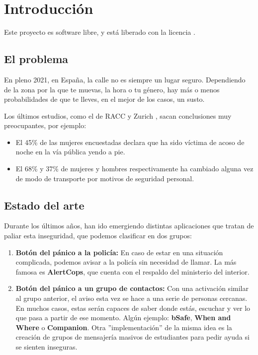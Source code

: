 \chapter{Introducción}

Este proyecto es software libre, y está liberado con la licencia \cite{gplv3}.

\section{El problema}
En pleno 2021, en España, la calle no es siempre un lugar seguro. Dependiendo de la zona por la que te muevas, la hora o tu género,
hay más o menos probabilidades de que te lleves, en el mejor de los casos, un susto.

Los últimos estudios, como el de RACC y Zurich \cite{racc-zurich}, sacan conclusiones muy preocupantes, por ejemplo: 
\begin{itemize}
  \item El 45\% de las mujeres encuestadas declara que ha sido víctima de acoso de noche en la vía pública yendo a pie.
  \item El 68\% y 37\% de mujeres y hombres respectivamente ha cambiado alguna vez de modo de transporte por motivos de seguridad personal.
\end{itemize}

\section{Estado del arte}\label{sec:art}
Durante los últimos años, han ido emergiendo distintas aplicaciones que tratan de paliar esta inseguridad, que podemos clasificar en dos grupos:
\begin{enumerate}
\item \textbf{Botón del pánico a la policía:} En caso de estar en una situación complicada, podemos avisar a la policía sin necesidad de llamar. La más famosa es \textbf{AlertCops}, que cuenta con el respaldo del ministerio del interior.
\item \textbf{Botón del pánico a un grupo de contactos:} Con una activación similar al grupo anterior, el aviso esta vez se hace a una serie de personas cercanas. En muchos casos, estas serán capaces de saber donde estás, escuchar y ver lo que pasa a partir de ese momento. Algún ejemplo: \textbf{bSafe}, \textbf{When and Where} o \textbf{Companion}.
Otra ''implementación'' de la misma idea es la creación de grupos de mensajería masivos de estudiantes para pedir ayuda si se sienten inseguras.
\end{enumerate}

